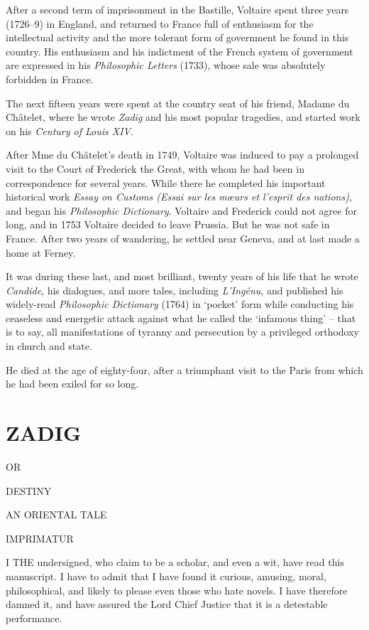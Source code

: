 \documentclass{article}
\begin{document}
\begin{center}
After a second term of imprisonment in the Bastille, Voltaire spent three years 
(1726–9) in England, and returned to France full of enthusiasm for the intellectual 
activity and the more tolerant form of government he found in this country. His 
enthusiasm and his indictment of the French system of government are expressed 
in his \textit{Philosophic Letters} (1733), whose sale was absolutely forbidden 
in France. 

The next fifteen years were spent at the country seat of his friend, Madame du 
Châtelet, where he wrote \textit{Zadig} and his most popular tragedies, and started 
work on his \textit{Century of Louis XIV}. 

After Mme du Châtelet's death in 1749, Voltaire was induced to pay a prolonged 
visit to the Court of Frederick the Great, with whom he had been in correspondence 
for several years. While there he completed his important historical work \textit{Essay 
on Customs (Essai sur les mœurs et l'esprit des nations)}, and began his \textit{Philosophic 
Dictionary}. Voltaire and Frederick could not agree for long, and in 1753 Voltaire 
decided to leave Prussia. But he was not safe in France. After two years of wandering, 
he settled near Geneva, and at last made a home at Ferney. 

It was during these last, and most brilliant, twenty years of his life that he 
wrote \textit{Candide}, his dialogues, and more tales, including \textit{L'Ingénu}, 
and published his widely-read \textit{Philosophic Dictionary} (1764) in `pocket' 
form while conducting his ceaseless and energetic attack against what he called 
the `infamous thing' – that is to say, all manifestations of tyranny and persecution 
by a privileged orthodoxy in church and state. 

He died at the age of eighty-four, after a triumphant visit to the Paris from which 
he had been exiled for so long.\pagebreak{} 

\section*{\textbf{ZADIG }}

\begin{center}
OR 

DESTINY 

AN ORIENTAL TALE 

IMPRIMATUR 
\end{center}

\baselineskip=12pt
\leftskip=0pt
I THE undersigned, who claim to be a scholar, and even a wit, have read this manuscript. 
I have to admit that I have found it curious, amusing, moral, philosophical, and 
likely to please even those who hate novels. I have therefore damned it, and have 
assured the Lord Chief Justice that it is a detestable performance.\pagebreak{} 


\end{center}
\end{document}
